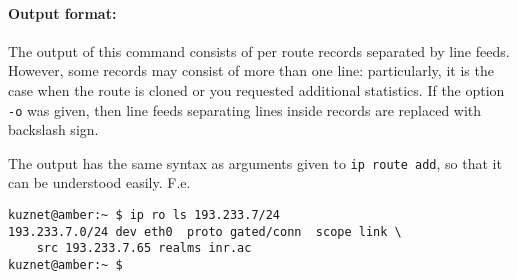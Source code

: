 \paragraph{Output format:} The output of this command consists
of per route records separated by line feeds.
However, some records may consist
of more than one line: particularly, it is the case when the route
is cloned or you requested additional statistics. If the option
\verb|-o| was given, then line feeds separating lines inside
records are replaced with backslash sign.

The output has the same syntax as arguments given to {\tt ip route add},
so that it can be understood easily. F.e.\
\begin{verbatim}
kuznet@amber:~ $ ip ro ls 193.233.7/24
193.233.7.0/24 dev eth0  proto gated/conn  scope link \
    src 193.233.7.65 realms inr.ac 
kuznet@amber:~ $
\end{verbatim}

